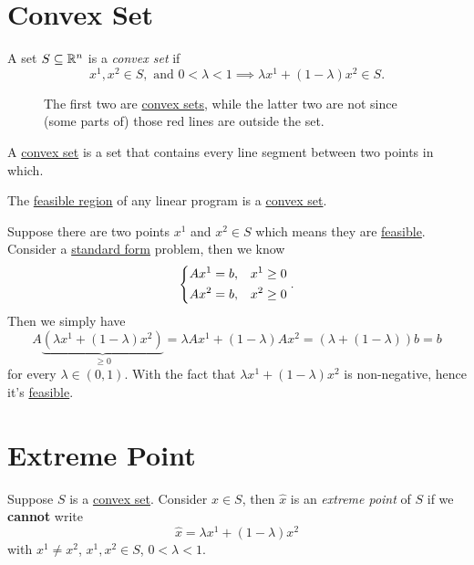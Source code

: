 \section{Convex Set}
\begin{definition}\label{def:convex-set}
	A set \(S\subseteq \mathbb{\MakeUppercase{R}}^n\) is a \emph{convex set} if
	\[
		x^1, x^2\in S, \text{ and }0<\lambda<1 \implies \lambda x^1 + (1-\lambda)x^2 \in S.
	\]
	\begin{figure}[H]
		\centering
		\caption{The first two are \hyperref[def:convex-set]{convex sets}, while the latter two are not since (some parts of) those red lines are outside the set.}
		\label{fig:convex-set}
	\end{figure}
\end{definition}

\begin{intuition}
	A \hyperref[def:convex-set]{convex set} is a set that contains every line segment between two points in which.
\end{intuition}

\begin{remark}
	The \hyperref[def:feasible-region]{feasible region} of any linear program is a \hyperref[def:convex-set]{convex set}.
\end{remark}
\begin{explanation}
	Suppose there are two points \(x^1\) and \(x^2\in S\) which means they are \hyperref[def:feasible-solution]{feasible}. Consider a
	\hyperref[def:standard-form]{standard form} problem, then we know
	\[
		\begin{dcases}
			Ax^1 = b, & x^1\geq 0 \\
			Ax^2 = b, & x^2\geq 0 \\
		\end{dcases}.
	\]
	Then we simply have
	\[
		A\underbrace{(\lambda x^1 + (1-\lambda)x^2)}_{\geq 0} = \lambda A x^1 + (1-\lambda)A x^2 = (\lambda + (1-\lambda))b = b
	\]
	for every \(\lambda \in (0,1)\). With the fact that \(\lambda x^1 + (1-\lambda)x^2\) is non-negative, hence it's \hyperref[def:feasible-solution]{feasible}.
\end{explanation}

\section{Extreme Point}
\begin{definition}\label{def:extreme-point}
	Suppose \(S\) is a \hyperref[def:convex-set]{convex set}. Consider \(\hat{x} \in S\), then \(\hat{x}\) is an \emph{extreme point} of \(S\) if we \textbf{cannot} write
	\[
		\hat{x} = \lambda x^1 + (1-\lambda)x^2
	\]
	with \(x^1 \neq x^2\), \(x^1, x^2\in S\), \(0<\lambda<1\).
\end{definition}

